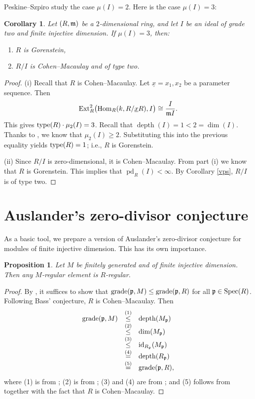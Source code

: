 \documentclass[10. pt,a4paper]{amsart}
\newtheorem{proposition}[theorem]{Proposition}
\newtheorem{corollary}[theorem]{Corollary}
\theoremstyle{definition}
\theoremstyle{remark}
\newcommand{\Spec}{\operatorname{Spec}}
\newcommand{\id}{\operatorname{id}}
\newcommand{\pd}{\operatorname{pd}}
\newcommand{\Ext}{\operatorname{Ext}}
\newcommand{\Hom}{\operatorname{Hom}}
\newcommand{\depth}{\operatorname{depth}}
\newcommand{\fm}{\frak{m}}
\newcommand{\fp}{\frak{p}}
\begin{document}
Peskine--Szpiro \cite[Corollary II.5.7]{PS} study the case $\mu(I) = 2$. Here is the case $\mu(I) = 3$:

\begin{corollary}
	Let $(R,\fm)$ be a $2$-dimensional ring, and let $I$ be an ideal of grade two and finite injective dimension. If $\mu(I) = 3$, then:
	\begin{enumerate}
		\item[(i)] $R$ is Gorenstein,
		\item[(ii)] $R/I$ is Cohen--Macaulay and of type two.
	\end{enumerate}
\end{corollary}

\begin{proof}
	(i) Recall that $R$ is Cohen--Macaulay. Let $\underline{x} = x_1, x_2$ be a parameter sequence. Then
	\[
	\Ext^2_R\bigl(\Hom_R(k, R/\underline{x}R), I\bigr) \cong \frac{I}{\fm I}.
	\]
	This gives $\operatorname{type}(R) \cdot \mu_2(I) = 3$. Recall that $\depth(I) = 1 < 2 = \dim(I)$. Thanks to \cite[Proposition 3.8]{fo}, we know that $\mu_2(I) \geq 2$. Substituting this into the previous equality yields $\operatorname{type}(R) = 1$; i.e., $R$ is Gorenstein.
	
	(ii) Since $R/I$ is zero-dimensional, it is Cohen--Macaulay. From part (i) we know that $R$ is Gorenstein. This implies that $\pd_R(I) < \infty$. By Corollary \ref{vps}, $R/I$ is of type two.
\end{proof}

\section{Auslander's zero-divisor conjecture}
 
 
As a basic tool, we prepare a version of Auslander's zero-divisor conjecture for modules of finite injective dimension. This has its own importance.

\begin{proposition}\label{AUS}
	Let $M$ be finitely generated and of finite injective dimension. Then any $M$-regular element is $R$-regular.
\end{proposition}

\begin{proof}
	By \cite[Proposition 3.6]{cel}, it suffices to show that $\operatorname{grade}(\fp, M) \leq \operatorname{grade}(\fp, R)$ for all $\fp \in \Spec(R)$. 
	Following Bass'  conjecture, $R$ is Cohen--Macaulay. Then
	\[
	\begin{array}{rcl}
	\operatorname{grade}(\fp, M) & \stackrel{(1)}{\leq} & \depth(M_{\fp}) \\
	& \stackrel{(2)}{\leq} & \dim(M_{\fp}) \\
	& \stackrel{(3)}{\leq} & \id_{R_{\fp}}(M_{\fp}) \\
	& \stackrel{(4)}{=} & \depth(R_{\fp}) \\
	& \stackrel{(5)}{=} & \operatorname{grade}(\fp, R),
	\end{array}
	\]
	where (1) is from \cite[Exercise 16.5]{mat}; (2) is from \cite[Proposition 1.2.12]{BH}; (3) and (4) are from \cite[Theorem 3.1.17]{BH}; and (5) follows from \cite[Theorem 2.1.3(b)]{BH} together with the fact that $R$ is Cohen--Macaulay.
\end{proof}
\end{document}
